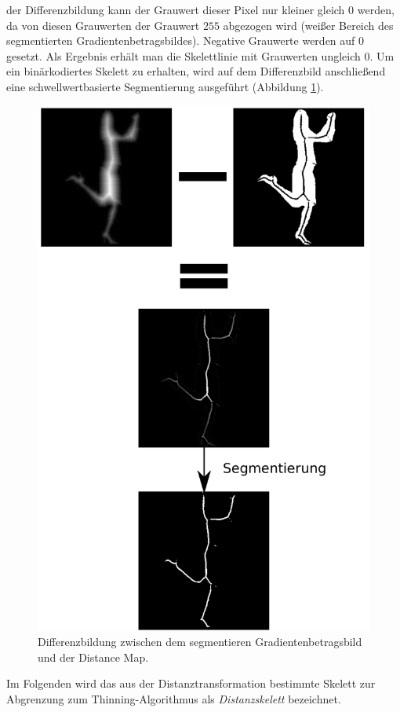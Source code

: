 der Differenzbildung kann der Grauwert dieser Pixel nur kleiner gleich 0 werden, da von diesen Grauwerten der Grauwert $255$ abgezogen wird (weißer Bereich des segmentierten Gradientenbetragsbildes). Negative
Grauwerte werden auf $0$ gesetzt. Als Ergebnis erhält man die Skelettlinie mit Grauwerten ungleich $0$. Um ein binärkodiertes Skelett zu erhalten, wird auf dem Differenzbild
anschließend eine schwellwertbasierte Segmentierung ausgeführt (Abbildung \ref{fig:differenzbildung}).
\begin{figure}
\centering
\includegraphics[width=0.8\linewidth]{./fig/differenzbildung}
\caption{Differenzbildung zwischen dem segmentieren Gradientenbetragsbild und der Distance Map.}
\label{fig:differenzbildung}
\end{figure}
Im Folgenden wird das aus der Distanztransformation bestimmte Skelett zur Abgrenzung zum Thinning-Algorithmus als \emph{Distanzskelett} bezeichnet.
\FloatBarrier
\clearpage
